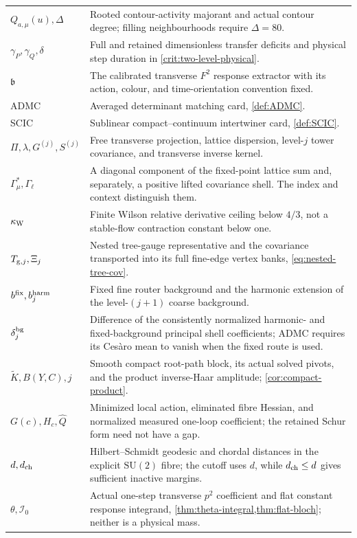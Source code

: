 \documentclass[11pt,oneside,openany]{book}
\theoremstyle{definition}
\theoremstyle{remark}
\newcommand{\SU}{\mathrm{SU}}
\begin{document}
\begin{longtable}{L{0.23\textwidth}L{0.70\textwidth}}
$Q_{a,\mu}(u),\Delta$ & Rooted contour-activity majorant and actual contour degree; filling neighbourhoods require $\Delta=80$. \\
$\gamma_P,\gamma_Q,\delta$ & Full and retained dimensionless transfer deficits and physical step duration in \cref{crit:two-level-physical}. \\

$\mathfrak b$ & The calibrated transverse $F^2$ response extractor with its action, colour, and time-orientation convention fixed. \\
ADMC & Averaged determinant matching card, \cref{def:ADMC}. \\
SCIC & Sublinear compact--continuum intertwiner card, \cref{def:SCIC}. \\
$\Pi,\lambda,G^{(j)},S^{(j)}$ & Free transverse projection, lattice dispersion, level-$j$ tower covariance, and transverse inverse kernel. \\
$\Gamma_\mu^*,\Gamma_\ell$ & A diagonal component of the fixed-point lattice sum and, separately, a positive lifted covariance shell. The index and context distinguish them. \\
$\kappa_{\rm W}$ & Finite Wilson relative derivative ceiling below $4/3$, not a stable-flow contraction constant below one. \\
$T_{{\rm g},j},\Xi_j$ & Nested tree-gauge representative and the covariance transported into its full fine-edge vertex banks, \cref{eq:nested-tree-cov}. \\
$b^{\rm fix},b_j^{\rm harm}$ & Fixed fine router background and the harmonic extension of the level-$(j+1)$ coarse background. \\
$\delta_j^{\rm bg}$ & Difference of the consistently normalized harmonic- and fixed-background principal shell coefficients; ADMC requires its Ces\`aro mean to vanish when the fixed route is used. \\
$\widetilde K,B(Y,C),j$ & Smooth compact root-path block, its actual solved pivots, and the product inverse-Haar amplitude; \cref{cor:compact-product}. \\
$G(c),H_c,\widehat Q$ & Minimized local action, eliminated fibre Hessian, and normalized measured one-loop coefficient; the retained Schur form need not have a gap. \\
$d,d_{\rm ch}$ & Hilbert--Schmidt geodesic and chordal distances in the explicit $\SU(2)$ fibre; the cutoff uses $d$, while $d_{\rm ch}\le d$ gives sufficient inactive margins. \\
$\theta,\mathcal I_0$ & Actual one-step transverse $p^2$ coefficient and flat constant response integrand, \cref{thm:theta-integral,thm:flat-bloch}; neither is a physical mass. \\

\end{longtable}
\end{document}
